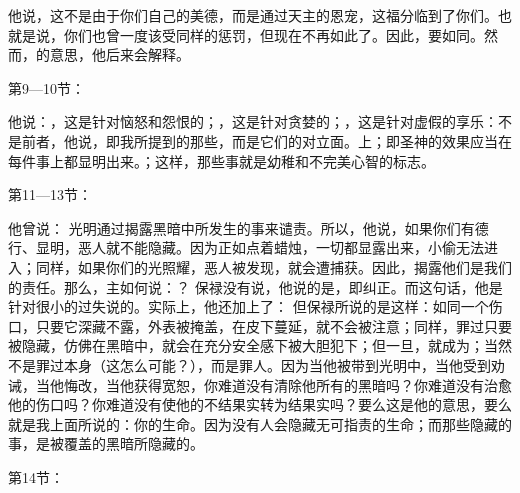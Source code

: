 \par

他说，这不是由于你们自己的美德，而是通过天主的恩宠，这福分临到了你们。也就是说，你们也曾一度该受同样的惩罚，但现在不再如此了。因此，要如同。然而，的意思，他后来会解释。\par

第9—10节：\par

他说：，这是针对恼怒和怨恨的；，这是针对贪婪的；，这是针对虚假的享乐：不是前者，他说，即我所提到的那些，而是它们的对立面。上；即圣神的效果应当在每件事上都显明出来。；这样，那些事就是幼稚和不完美心智的标志。\par

第11—13节：\par

他曾说： 光明通过揭露黑暗中所发生的事来谴责。所以，他说，如果你们有德行、显明，恶人就不能隐藏。因为正如点着蜡烛，一切都显露出来，小偷无法进入；同样，如果你们的光照耀，恶人被发现，就会遭捕获。因此，揭露他们是我们的责任。那么，主如何说：？ 保禄没有说，他说的是，即纠正。而这句话，他是针对很小的过失说的。实际上，他还加上了： 但保禄所说的是这样：如同一个伤口，只要它深藏不露，外表被掩盖，在皮下蔓延，就不会被注意；同样，罪过只要被隐藏，仿佛在黑暗中，就会在充分安全感下被大胆犯下；但一旦，就成为；当然不是罪过本身（这怎么可能？），而是罪人。因为当他被带到光明中，当他受到劝诫，当他悔改，当他获得宽恕，你难道没有清除他所有的黑暗吗？你难道没有治愈他的伤口吗？你难道没有使他的不结果实转为结果实吗？要么这是他的意思，要么就是我上面所说的：你的生命。因为没有人会隐藏无可指责的生命；而那些隐藏的事，是被覆盖的黑暗所隐藏的。\par

第14节：\par

